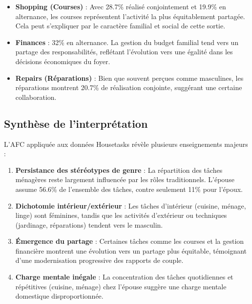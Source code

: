 \documentclass[12pt,a4paper]{article}
\begin{document}
\begin{itemize}
    \item \textbf{Shopping (Courses)} : Avec 28.7\% réalisé conjointement et 19.9\% en alternance, les courses représentent l'activité la plus équitablement partagée. Cela peut s'expliquer par le caractère familial et social de cette sortie.
    
    \item \textbf{Finances} : 32\% en alternance. La gestion du budget familial tend vers un partage des responsabilités, reflétant l'évolution vers une égalité dans les décisions économiques du foyer.
    
    \item \textbf{Repairs (Réparations)} : Bien que souvent perçues comme masculines, les réparations montrent 20.7\% de réalisation conjointe, suggérant une certaine collaboration.
\end{itemize}

\subsection{Synthèse de l'interprétation}

L'AFC appliquée aux données Housetasks révèle plusieurs enseignements majeurs :

\begin{enumerate}
    \item \textbf{Persistance des stéréotypes de genre} : La répartition des tâches ménagères reste largement influencée par les rôles traditionnels. L'épouse assume 56.6\% de l'ensemble des tâches, contre seulement 11\% pour l'époux.
    
    \item \textbf{Dichotomie intérieur/extérieur} : Les tâches d'intérieur (cuisine, ménage, linge) sont féminines, tandis que les activités d'extérieur ou techniques (jardinage, réparations) tendent vers le masculin.
    
    \item \textbf{Émergence du partage} : Certaines tâches comme les courses et la gestion financière montrent une évolution vers un partage plus équitable, témoignant d'une modernisation progressive des rapports de couple.
    
    \item \textbf{Charge mentale inégale} : La concentration des tâches quotidiennes et répétitives (cuisine, ménage) chez l'épouse suggère une charge mentale domestique disproportionnée.
\end{enumerate}
\end{document}
